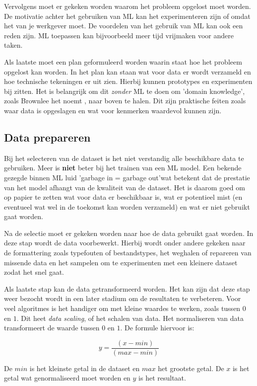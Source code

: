 Vervolgens moet er gekeken worden waarom het probleem opgelost moet worden. De motivatie achter het gebruiken van ML kan het experimenteren zijn of omdat het van je werkgever moet. De voordelen van het gebruik van ML kan ook een reden zijn. ML toepassen kan bijvoorbeeld meer tijd vrijmaken voor andere taken.

Als laatste moet een plan geformuleerd worden waarin staat hoe het probleem opgelost kan worden. In het plan kan staan wat voor data er wordt verzameld en hoe technische tekeningen er uit zien. Hierbij kunnen prototypes en experimenten bij zitten. Het is belangrijk om dit \textit{zonder} ML te doen om 'domain knowledge'\space, zoals Brownlee het noemt \cite{ml-define-ml-problem-brownlee}, naar boven te halen. Dit zijn praktische feiten zoals waar data is opgeslagen en wat voor kenmerken waardevol kunnen zijn.

\subsection{Data prepareren}\label{subsec:data-prepareren}
Bij het selecteren van de dataset is het niet verstandig alle beschikbare data te gebruiken. Meer is \textbf{niet} beter bij het trainen van een ML model. Een bekende gezegde binnen ML luid 'garbage in = garbage out'\space wat betekent dat de prestatie van het model afhangt van de kwaliteit van de dataset. Het is daarom goed om op papier te zetten wat voor data er beschikbaar is, wat er potentieel mist (en eventueel wat wel in de toekomst kan worden verzameld) en wat er niet gebruikt gaat worden.

Na de selectie moet er gekeken worden naar hoe de data gebruikt gaat worden. In deze stap wordt de data voorbewerkt. Hierbij wordt onder andere gekeken naar de formattering zoals typefouten of bestandstypes, het weghalen of repareren van missende data en het sampelen om te experimenten met een kleinere dataset zodat het snel gaat. 

Als laatste stap kan de data getransformeerd worden. Het kan zijn dat deze stap weer bezocht wordt in een later stadium om de resultaten te verbeteren. Voor veel algoritmes is het handiger om met kleine waardes te werken, zoals tussen \(0\) en \(1\). Dit heet \textit{data scaling}, of het schalen van data. Het normaliseren van data transformeert de waarde tussen \(0\) en \(1\). De formule hiervoor is:

\[y = \frac{(x - min)}{(max - min)}\]

De \(min\) is het kleinste getal in de dataset en \(max\) het grootste getal. De \(x\) is het getal wat genormaliseerd moet worden en \(y\) is het resultaat.

